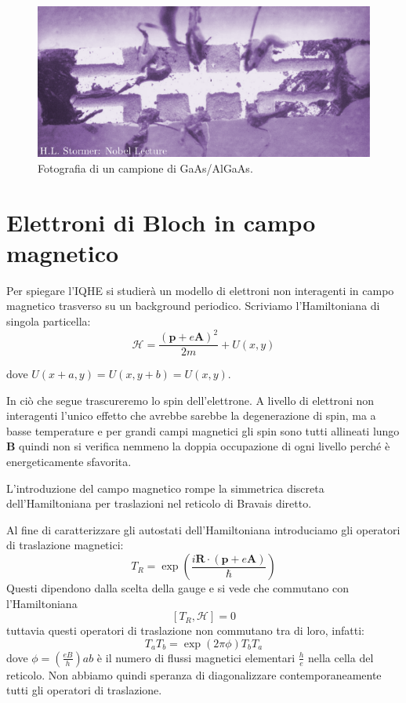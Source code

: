 \documentclass[12pt,a4paper]{article}
\begin{document}
\begin{figure}[!htb]
\centering
\includegraphics[scale=0.6]{immagini/real.png}
\caption{Fotografia di un campione di GaAs/AlGaAs.\label{sample}}
\end{figure}

\section{Elettroni di Bloch in campo magnetico}
Per spiegare l'IQHE si studierà un modello di elettroni non interagenti in campo magnetico trasverso  su un background periodico. Scriviamo l'Hamiltoniana di singola particella:
\begin{equation}
\mathcal{H} = \frac{(\mathbf{p} + e \mathbf{A})^2}{2m} + U(x, y)
\end{equation}

dove $U(x+a,y) = U(x, y+b) = U(x, y)$.

In ciò che segue trascureremo lo spin dell'elettrone. A livello di elettroni non interagenti l'unico effetto che avrebbe sarebbe la degenerazione di spin, ma a basse temperature e per grandi campi magnetici gli spin sono tutti allineati lungo $\mathbf{B}$ quindi non si verifica nemmeno la doppia occupazione di ogni livello perché è energeticamente sfavorita.

L'introduzione del campo magnetico rompe la simmetrica discreta dell'Hamiltoniana per traslazioni nel reticolo di Bravais diretto.

Al fine di caratterizzare gli autostati dell'Hamiltoniana introduciamo gli operatori di traslazione magnetici: 
\begin{equation}
T_{R} = \exp \left( \frac{i \mathbf{R} \cdot \left( \mathbf{p} + e \mathbf{A} \right)}{\hbar} \right)
\end{equation}
Questi dipendono dalla scelta della gauge e si vede che commutano con l'Hamiltoniana $$[T_{R}, \mathcal{H}] = 0$$
tuttavia questi operatori di traslazione non commutano tra di loro, infatti:
$$ T_{a} T_{b} = \exp \left( 2 \pi \phi \right) T_{b} T_{a} $$ dove $\phi = \left( \frac{e B}{h} \right) ab$ è il numero di flussi magnetici elementari $\frac{h}{e}$ nella cella del reticolo.
Non abbiamo quindi speranza di diagonalizzare contemporaneamente tutti gli operatori di traslazione.
\end{document}
